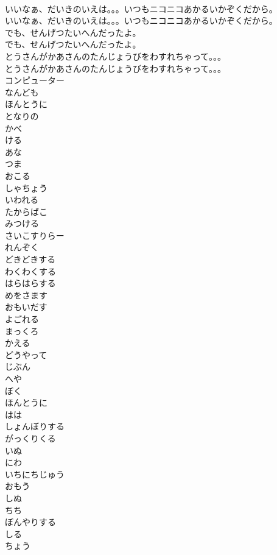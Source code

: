 \documentclass[8pt]{extreport}
\begin{document}
\begin{CJK}{UTF8}{min}
\\	いいなぁ、だいきのいえは。。。いつもニコニコあかるいかぞくだから。
\\	いいなぁ、だいきのいえは。。。いつもニコニコあかるいかぞくだから。
\\	でも、せんげつたいへんだったよ。
\\	でも、せんげつたいへんだったよ。
\\	とうさんがかあさんのたんじょうびをわすれちゃって。。。
\\	とうさんがかあさんのたんじょうびをわすれちゃって。。。
\\	コンピューター
\\	なんども
\\	ほんとうに
\\	となりの
\\	かべ
\\	ける
\\	あな
\\	つま
\\	おこる
\\	しゃちょう
\\	いわれる
\\	たからばこ
\\	みつける
\\	さいこすりらー
\\	れんぞく
\\	どきどきする
\\	わくわくする
\\	はらはらする
\\	めをさます
\\	おもいだす
\\	よごれる
\\	まっくろ
\\	かえる
\\	どうやって
\\	じぶん
\\	へや
\\	ぼく
\\	ほんとうに
\\	はは
\\	しょんぼりする
\\	がっくりくる
\\	いぬ
\\	にわ
\\	いちにちじゅう
\\	おもう
\\	しぬ
\\	ちち
\\	ぼんやりする
\\	しる
\\	ちょう

\end{CJK}
\end{document}
